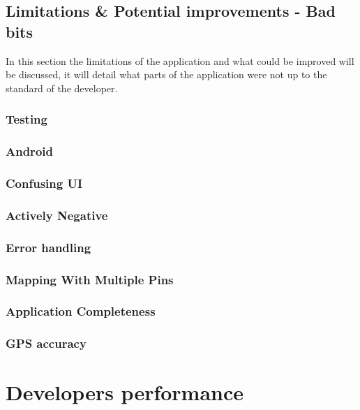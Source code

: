 \subsection{Limitations \& Potential improvements - Bad bits}

In this section the limitations of the application and what could be improved will be discussed, it will detail what parts of the application were not up to the standard of the developer.

\subsubsection{Testing}

\subsubsection{Android}


\subsubsection{Confusing UI}

\subsubsection{Actively Negative}

\subsubsection{Error handling}

\subsubsection{Mapping With Multiple Pins}

\subsubsection{Application Completeness}

\subsubsection{GPS accuracy}


\section{Developers performance}

